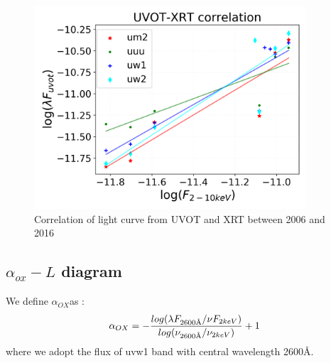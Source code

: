 \documentclass{aastex63}
\newcommand{\alphaox}{$\alpha_{OX}$}
\newcommand{\angstrom}{\text{\normalfont\AA}}
\begin{document}
\begin{figure}
\centering
	\includegraphics[width=0.9\textwidth]{./pic/uvot_xrt_correlation-fig.png}
    \caption{Correlation of light curve from UVOT and XRT  between 2006 and 2016}
    \label{fig:correlation-uvot-xray}
\end{figure}















\subsection{\texorpdfstring{$\alpha_{ox}-L$}. diagram \label{subsec:alpha_ox}}

We define \alphaox as :
 $$\alpha_{OX}  = - \frac{log(\lambda F_{2600 \angstrom}/\nu F_{2keV})}{log(\nu_{ 2600 \angstrom }/\nu_{2keV})}+1$$
 where we adopt the flux of uvw1 band with central wavelength {2600{\AA}}.
\end{document}
